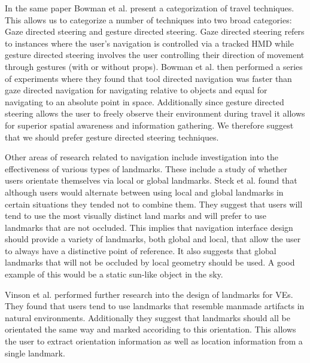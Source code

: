 \documentclass{sig-alternate-05-2015}
\begin{document}
 In the same paper Bowman et al. present a categorization of travel techniques\cite{Bowman1997}. This allows us to categorize a number of techniques into two broad categories: Gaze directed steering and gesture directed steering. Gaze directed steering refers to instances where the user's navigation is controlled via a tracked HMD while gesture directed  steering involves the user controlling their direction of movement through gestures (with or without props). Bowman et al. then performed a series of experiments where they found that tool directed navigation was faster than gaze directed navigation for navigating relative to objects and equal for navigating to an absolute point in space. Additionally since gesture directed steering allows the user to freely observe their environment during travel it allows for superior spatial awareness and information gathering. We therefore suggest that we should prefer gesture directed steering techniques.

Other areas of research related to navigation include investigation into the effectiveness of various types of landmarks. These include a study of whether users orientate themselves via local or global landmarks\cite{Steck2000}. Steck et al. found that although users would alternate between using local and global landmarks in certain situations they tended not to combine them. They suggest that users will tend to use the most visually distinct land marks and will prefer to use landmarks that are not occluded. This implies that navigation interface design should provide a variety of landmarks, both global and local, that allow the user to always have a distinctive point of reference. It also suggests that global landmarks that will not be occluded by local geometry should be used. A good example of this would be a static sun-like object in the sky.

Vinson et al. performed further research into the design of landmarks for VEs.\cite{Vinson1999} They found that users tend to use landmarks that resemble manmade artifacts in natural environments. Additionally they suggest that landmarks should all be orientated the same way and marked accoriding to this orientation. This allows the user to extract orientation information as well as location information from a single landmark.
\end{document}
